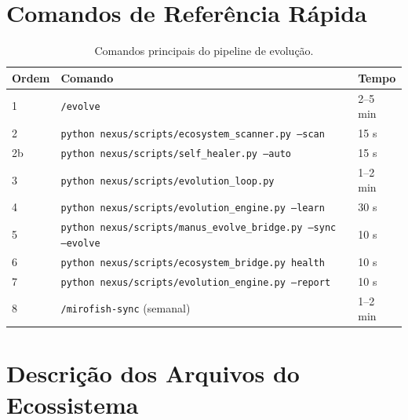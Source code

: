 \documentclass[
  article,
  12pt,
  oneside,
  a4paper,
  brazil,
  sumario=tradicional
]{abntex2}
\begin{document}
\begin{apendicesenv}
\chapter{Comandos de Referência Rápida}

\begin{table}[H]
  \centering
  \small
  \caption{Comandos principais do pipeline de evolução.}
  \begin{tabular}{|l|l|l|}
    \hline
    \textbf{Ordem} & \textbf{Comando} & \textbf{Tempo} \\
    \hline
    1 & \texttt{/evolve} & 2--5 min \\
    2 & \texttt{python nexus/scripts/ecosystem\_scanner.py --scan} & 15 s \\
    2b & \texttt{python nexus/scripts/self\_healer.py --auto} & 15 s \\
    3 & \texttt{python nexus/scripts/evolution\_loop.py} & 1--2 min \\
    4 & \texttt{python nexus/scripts/evolution\_engine.py --learn} & 30 s \\
    5 & \texttt{python nexus/scripts/manus\_evolve\_bridge.py --sync --evolve} & 10 s \\
    6 & \texttt{python nexus/scripts/ecosystem\_bridge.py health} & 10 s \\
    7 & \texttt{python nexus/scripts/evolution\_engine.py --report} & 10 s \\
    8 & \texttt{/mirofish-sync} (semanal) & 1--2 min \\
    \hline
  \end{tabular}
\end{table}

\chapter{Descrição dos Arquivos do Ecossistema}


\end{apendicesenv}
\end{document}
